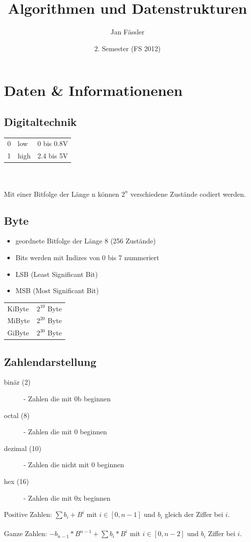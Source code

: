 \documentclass[a4paper,10pt]{article}
\title{Algorithmen und Datenstrukturen}
\author{Jan F\"assler}
\date{2. Semester (FS 2012)}
\begin{document}
\maketitle
\newpage
\thispagestyle{fancy} %

\section{Daten \& Informationenen}

\subsection{Digitaltechnik}
\begin{tabular}{l l l}
	0 & low & 0 bis 0.8V \\
	1 & high & 2.4 bis 5V
\end{tabular} \\ \\
Mit einer Bitfolge der L\"ange n k\"onnen $2^n$ verschiedene Zust\"ande codiert werden.

\subsection{Byte}
\begin{itemize}
	\item geordnete Bitfolge der L\"ange 8 (256 Zust\"ande)
	\item Bits werden mit Indizes von 0 bis 7 nummeriert
	\item LSB (Least Significant Bit)
	\item MSB (Most Significant Bit)
\end{itemize}
\begin{tabular}{l l}
	KiByte & $2^{10}$ Byte \\
	MiByte & $2^{20}$ Byte \\
	GiByte & $2^{30}$ Byte \\
\end{tabular}

\subsection{Zahlendarstellung}
\begin{description}
	\item[bin\"ar (2)] - Zahlen die mit 0b beginnen
	\item[octal (8)] - Zahlen die mit 0 beginnen
	\item[dezimal (10)] - Zahlen die nicht mit 0 beginnen
	\item[hex (16)] - Zahlen die mit 0x beginnen
\end{description}
Positive Zahlen: $\sum b_i+B^i$ mit $i \in [0,n-1]$ und $b_i$ gleich der Ziffer bei $i$. \\ \\
Ganze Zahlen: $-b_{n-1}*B^{n-1}+\sum b_i*B^i$ mit $i \in [0,n-2]$ und  $b_i$ Ziffer bei $i$.
\end{document}
